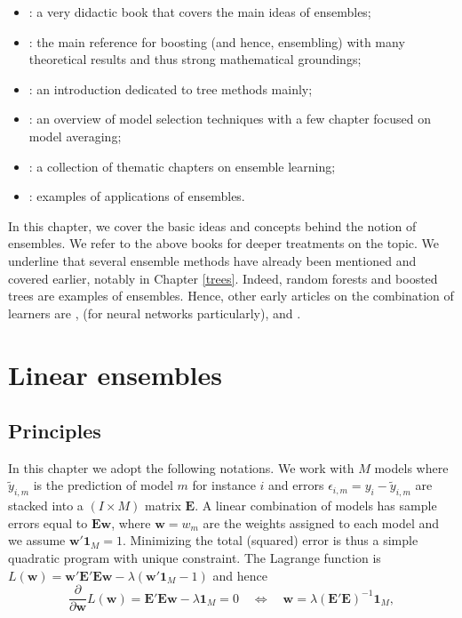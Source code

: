 \documentclass[]{krantz}
\providecommand{\tightlist}{%
  \setlength{\itemsep}{0pt}\setlength{\parskip}{0pt}}
\theoremstyle{definition}
\theoremstyle{definition}
\theoremstyle{definition}
\theoremstyle{remark}
\begin{document}
\begin{itemize}
\tightlist
\item
  \citet{zhou2012ensemble}: a very didactic book that covers the main
  ideas of ensembles;\\
\item
  \citet{schapire2012boosting}: the main reference for boosting (and
  hence, ensembling) with many theoretical results and thus strong
  mathematical groundings;\\
\item
  \citet{seni2010ensemble}: an introduction dedicated to tree methods
  mainly;\\
\item
  \citet{claeskens2008model}: an overview of model selection techniques
  with a few chapter focused on model averaging;\\
\item
  \citet{zhang2012ensemble}: a collection of thematic chapters on
  ensemble learning;\\
\item
  \citet{okun2011ensembles}: examples of applications of ensembles.
\end{itemize}

In this chapter, we cover the basic ideas and concepts behind the notion
of ensembles. We refer to the above books for deeper treatments on the
topic. We underline that several ensemble methods have already been
mentioned and covered earlier, notably in Chapter \ref{trees}. Indeed,
random forests and boosted trees are examples of ensembles. Hence, other
early articles on the combination of learners are
\citet{schapire1990strength}, \citet{jacobs1991adaptive} (for neural
networks particularly), and \citet{freund1997decision}.

\hypertarget{linear-ensembles}{%
\section{Linear ensembles}\label{linear-ensembles}}

\hypertarget{principles}{%
\subsection{Principles}\label{principles}}

In this chapter we adopt the following notations. We work with \(M\)
models where \(\tilde{y}_{i,m}\) is the prediction of model \(m\) for
instance \(i\) and errors \(\epsilon_{i,m}=y_i-\tilde{y}_{i,m}\) are
stacked into a \((I\times M)\) matrix \(\textbf{E}\). A linear
combination of models has sample errors equal to \(\textbf{Ew}\), where
\(\textbf{w}=w_m\) are the weights assigned to each model and we assume
\(\textbf{w}'\textbf{1}_M=1\). Minimizing the total (squared) error is
thus a simple quadratic program with unique constraint. The Lagrange
function is
\(L(\textbf{w})=\textbf{w}'\textbf{E}'\textbf{E}\textbf{w}-\lambda (\textbf{w}'\textbf{1}_M-1)\)
and hence
\[\frac{\partial}{\partial \textbf{w}}L(\textbf{w})=\textbf{E}'\textbf{E}\textbf{w}-\lambda \textbf{1}_M=0 \quad \Leftrightarrow \quad \textbf{w}=\lambda(\textbf{E}'\textbf{E})^{-1}\textbf{1}_M,\]
\end{document}
